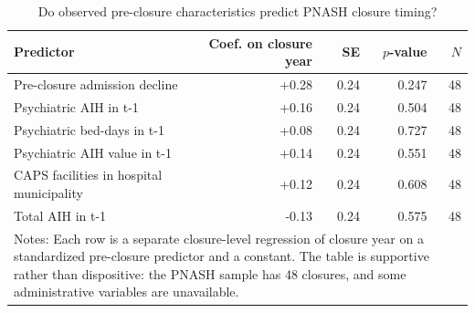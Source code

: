 \begin{table}[!htbp]\centering
\caption{Do observed pre-closure characteristics predict PNASH closure timing?}
\label{tab:preclosure-predictor-tests}
\small
\begin{tabular}{lrrrr}
\toprule
Predictor & Coef. on closure year & SE & $p$-value & $N$ \\
\midrule
Pre-closure admission decline & +0.28 & 0.24 & 0.247 & 48 \\
Psychiatric AIH in t-1 & +0.16 & 0.24 & 0.504 & 48 \\
Psychiatric bed-days in t-1 & +0.08 & 0.24 & 0.727 & 48 \\
Psychiatric AIH value in t-1 & +0.14 & 0.24 & 0.551 & 48 \\
CAPS facilities in hospital municipality & +0.12 & 0.24 & 0.608 & 48 \\
Total AIH in t-1 & -0.13 & 0.24 & 0.575 & 48 \\
\bottomrule
\multicolumn{5}{p{0.86\textwidth}}{\footnotesize Notes: Each row is a separate closure-level regression of closure year on a standardized pre-closure predictor and a constant. The table is supportive rather than dispositive: the PNASH sample has 48 closures, and some administrative variables are unavailable.}\\
\end{tabular}
\end{table}
